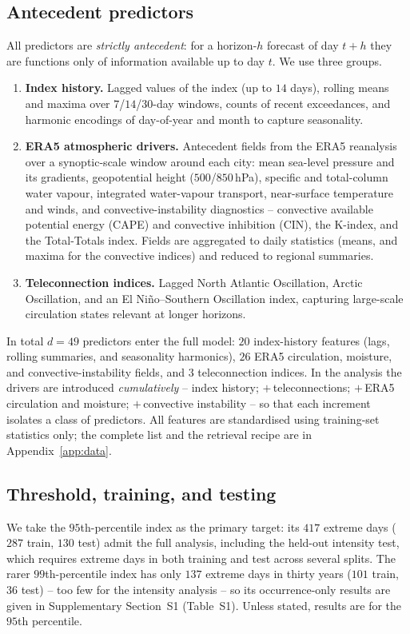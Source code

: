 \documentclass[11pt,a4paper]{article}
\begin{document}
\subsection{Antecedent predictors}\label{sec:data-predictors}
All predictors are \emph{strictly antecedent}: for a horizon-$h$ forecast of day
$t+h$ they are functions only of information available up to day $t$. We use
three groups.
\begin{enumerate}[leftmargin=1.6em,itemsep=2pt]
  \item \textbf{Index history.} Lagged values of the index (up to $14$ days),
  rolling means and maxima over $7$/$14$/$30$-day windows, counts of recent
  exceedances, and harmonic encodings of day-of-year and month to capture
  seasonality.
  \item \textbf{ERA5 atmospheric drivers.} Antecedent fields from the ERA5
  reanalysis over a synoptic-scale window around each city: mean sea-level pressure
  and its gradients, geopotential height ($500$/$850\,$hPa), specific and
  total-column water vapour, integrated water-vapour transport, near-surface
  temperature and winds, and convective-instability diagnostics -- convective
  available potential energy (CAPE) and convective inhibition (CIN), the
  K-index, and the Total-Totals index. Fields are aggregated to daily statistics (means, and maxima for the
  convective indices) and reduced to regional summaries.
  \item \textbf{Teleconnection indices.} Lagged North Atlantic Oscillation,
  Arctic Oscillation, and an El Ni\~no--Southern Oscillation index, capturing
  large-scale circulation states relevant at longer horizons.
\end{enumerate}
In total $d=49$ predictors enter the full model: $20$ index-history features
(lags, rolling summaries, and seasonality harmonics), $26$ ERA5 circulation,
moisture, and convective-instability fields, and $3$ teleconnection indices.
In the analysis the drivers are introduced \emph{cumulatively} -- index history;
$+$\,teleconnections; $+$\,ERA5 circulation and moisture; $+$\,convective
instability -- so that each increment isolates a class of predictors. All
features are standardised using training-set statistics only; the complete list
and the retrieval recipe are in Appendix~\ref{app:data}.



\subsection{Threshold, training, and testing}\label{sec:data-split}
We take the {$95$th-percentile index as the primary target}: its $417$
extreme days ($287$ train, $130$ test) admit the full analysis, including the
held-out intensity test, which requires extreme days in both training and test
across several splits. The rarer $99$th-percentile index has only $137$ extreme
days in thirty years ($101$ train, $36$ test) -- too few for the intensity
analysis -- so its occurrence-only results are given in Supplementary
Section~S1 (Table~S1). Unless stated, results are for the $95$th percentile.
\end{document}
